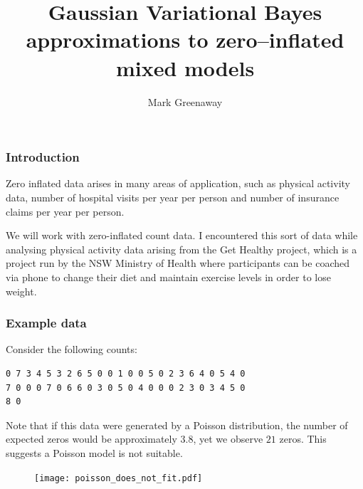 \documentclass{beamer}
\title{Gaussian Variational Bayes approximations to zero--inflated mixed models}
\author{Mark Greenaway}
\begin{document}
\begin{frame}
	\titlepage
\end{frame}

\begin{frame}
	\frametitle{Introduction}

	Zero inflated data arises in many areas of application, such as physical activity data, number of hospital
	visits per year per person and number of insurance claims per year per person.
						
	\bigskip 
		
	We will work with zero-inflated count data. I encountered this sort of data  while analysing physical
	activity data arising from the Get Healthy project, which is a project run by the NSW Ministry of Health
	where participants can be coached via phone to change their diet and maintain exercise levels in order to
	lose weight.
		
\end{frame}

\begin{frame}[fragile]
	\frametitle{Example data}
	Consider the following counts:
	\begin{verbatim}
0 7 3 4 5 3 2 6 5 0 0 1 0 0 5 0 2 3 6 4 0 5 4 0
7 0 0 0 7 0 6 6 0 3 0 5 0 4 0 0 0 2 3 0 3 4 5 0
8 0
	\end{verbatim}
						
		
	\noindent Note that if this data were generated by a Poisson distribution, the number of expected
	zeros would be approximately $3.8$, yet we observe $21$ zeros. This suggests a Poisson model is not suitable.
						
	\begin{figure}
		\texttt{[image: poisson\_does\_not\_fit.pdf]}
	\end{figure}%
\end{frame}
\end{document}
